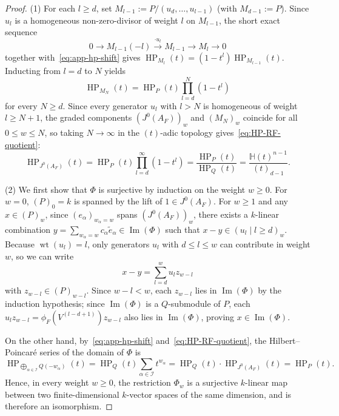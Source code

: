\documentclass[a4paper, 12pt]{amsart}
\theoremstyle{remark}
\begin{document}
\begin{proof}
(1) For each $l \ge d$,
set $M_{l - 1} := P / (u_d, \dots, u_{l - 1})$ (with $M_{d - 1} := P$).
Since $u_l$ is a homogeneous non-zero-divisor of weight $l$ on $M_{l - 1}$,
the short exact sequence
\begin{equation*}
  0 \longrightarrow M_{l - 1}(-l) \xrightarrow{\cdot u_l} M_{l - 1} \longrightarrow M_l \longrightarrow 0
\end{equation*}
together with~\eqref{eq:app-hp-shift} gives $\operatorname{HP}_{M_l}(t) = (1 - t^l) \operatorname{HP}_{M_{l - 1}}(t)$.
Inducting from $l = d$ to $N$ yields
\begin{equation*}
  \operatorname{HP}_{M_N}(t) = \operatorname{HP}_{P}(t) \prod_{l = d}^N (1 - t^l)
\end{equation*}
for every $N \ge d$.
Since every generator $u_l$ with $l > N$ is homogeneous of weight $l \ge N + 1$,
the graded components $(J^0(A_F))_w$ and $(M_N)_w$ coincide for all $0 \le w \le N$,
so taking $N \to \infty$ in the $(t)$-adic topology gives~\eqref{eq:HP-RF-quotient}:
\begin{equation*}
  \operatorname{HP}_{J^0(A_F)}(t) = \operatorname{HP}_{P}(t) \prod_{l = d}^\infty (1 - t^l) = \frac{\operatorname{HP}_{P}(t)}{\operatorname{HP}_{Q}(t)} = \frac{\mathbb{H}(t)^{n - 1}}{(t)_{d - 1}}.
\end{equation*}

(2) We first show that $\Phi$ is surjective by induction on the weight $w \ge 0$.
For $w = 0$,
$(P)_0 = k$ is spanned by the lift of $1 \in J^0(A_F)$.
For $w \ge 1$ and any $x \in (P)_w$,
since $(e_\alpha)_{w_\alpha = w}$ spans $(J^0(A_F))_w$,
there exists a $k$-linear combination $y = \sum_{w_\alpha = w} c_\alpha \tilde{e}_\alpha \in \operatorname{Im}(\Phi)$ such that $x - y \in (u_l \mid l \ge d)_w$.
Because $\operatorname{wt}(u_l) = l$,
only generators $u_l$ with $d \le l \le w$ can contribute in weight $w$,
so we can write
\begin{equation*}
  x - y = \sum_{l = d}^w u_l z_{w - l}
\end{equation*}
with $z_{w - l} \in (P)_{w - l}$.
Since $w - l < w$,
each $z_{w - l}$ lies in $\operatorname{Im}(\Phi)$ by the induction hypothesis;
since $\operatorname{Im}(\Phi)$ is a $Q$-submodule of $P$,
each $u_l z_{w - l} = \phi_F(V^{(l - d + 1)}) z_{w - l}$ also lies in $\operatorname{Im}(\Phi)$,
proving $x \in \operatorname{Im}(\Phi)$.

On the other hand,
by~\eqref{eq:app-hp-shift} and~\eqref{eq:HP-RF-quotient},
the Hilbert--Poincaré series of the domain of $\Phi$ is
\begin{equation*}
  \operatorname{HP}_{\bigoplus_{\alpha \in \mathcal{I}} Q(-w_\alpha)}(t)
  = \operatorname{HP}_{Q}(t) \sum_{\alpha \in \mathcal{I}} t^{w_\alpha}
  = \operatorname{HP}_{Q}(t) \cdot \operatorname{HP}_{J^0(A_F)}(t)
  = \operatorname{HP}_{P}(t).
\end{equation*}
Hence,
in every weight $w \ge 0$,
the restriction $\Phi_w$ is a surjective $k$-linear map between two finite-dimensional $k$-vector spaces of the same dimension,
and is therefore an isomorphism.


\end{proof}
\end{document}
